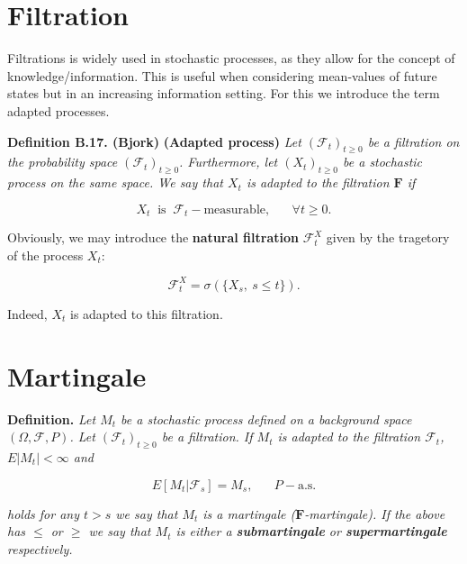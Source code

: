 \documentclass[
]{book}
\begin{document}
\newpage

\hypertarget{filtration}{%
\section{Filtration}\label{filtration}}

Filtrations is widely used in stochastic processes, as they allow for the concept of knowledge/information. This is useful when considering mean-values of future states but in an increasing information setting. For this we introduce the term adapted processes.

\textbf{Definition B.17. (Bjork)} \textbf{(Adapted process)} \emph{Let \((\mathcal{F}_t)_{t\ge 0}\) be a filtration on the probability space \((\mathcal{F}_t)_{t\ge 0}\). Furthermore, let \((X_t)_{t\ge 0}\) be a stochastic process on the same space. We say that \(X_t\) is adapted to the filtration \(\mathbf{F}\) if}

\[X_t\ \text{ is }\ \mathcal{F}_t-\text{measurable},\hspace{20pt}\forall t\ge 0.\]

Obviously, we may introduce the \textbf{natural filtration} \(\mathcal{F}^X_t\) given by the tragetory of the process \(X_t\):

\[\mathcal{F}^X_t=\sigma(\{X_s,\ s\le t\}).\]

Indeed, \(X_t\) is adapted to this filtration.

\newpage

\hypertarget{martingale}{%
\section{Martingale}\label{martingale}}

\textbf{Definition.} \emph{Let \(M_t\) be a stochastic process defined on a background space \((\Omega,\mathcal{F},P)\). Let \((\mathcal{F}_t)_{t\ge 0}\) be a filtration. If \(M_t\) is adapted to the filtration \(\mathcal{F}_t\), \(E\vert M_t\vert <\infty\) and}

\[E[M_t\vert \mathcal{F}_s]=M_s,\hspace{20pt}P-\text{a.s.}\]

\emph{holds for any \(t>s\) we say that \(M_t\) is a martingale (\(\mathbf{F}\)-martingale). If the above has \(\le\) or \(\ge\) we say that \(M_t\) is either a \textbf{submartingale} or \textbf{supermartingale} respectively.}
\end{document}
